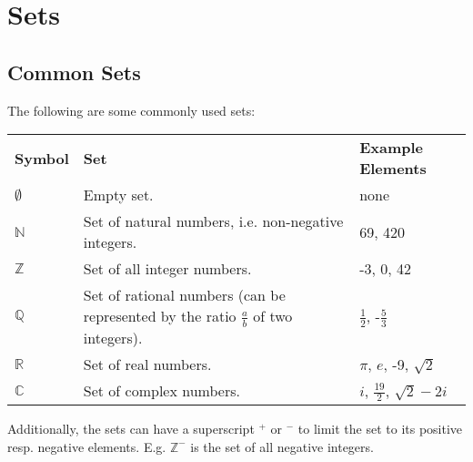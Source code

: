 \documentclass[../main.tex]{subfiles}
\begin{document}
\section{Sets}

\subsection{Common Sets}

The following are some commonly used sets:

\begin{tabular}{ p{1.5cm} p{9cm} p{4cm} }
  \textbf{Symbol} & \textbf{Set} & \textbf{Example Elements} \\
  $\emptyset$ & Empty set. & none \\
  $\mathbb{N}$ & Set of natural numbers, i.e. non-negative integers. & 69, 420 \\
  $\mathbb{Z}$ & Set of all integer numbers. & -3, 0, 42  \\
  $\mathbb{Q}$ & Set of rational numbers (can be represented by the ratio $\frac{a}{b}$ of two integers). & $\frac{1}{2}$, -$\frac{5}{3}$ \\
  $\mathbb{R}$ & Set of real numbers. & $\pi$, $e$, -9, $\sqrt{2}$ \\
  $\mathbb{C}$ & Set of complex numbers. & $i$, $\frac{19}{2}$, $\sqrt{2}-2i$ \\
\end{tabular}

Additionally, the sets can have a superscript $^+$ or $^-$ to limit the set to its positive resp. negative elements. E.g. $\mathbb{Z}^-$ is the set of all negative integers.
\end{document}
